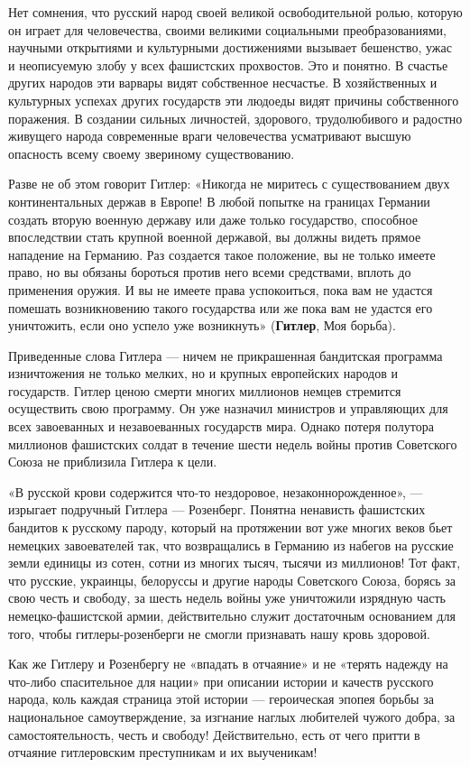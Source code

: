 \documentclass[12pt, a4paper, openany]{book}
\begin{document}
Нет сомнения, что русский народ своей великой освободительной ролью, которую он играет для человечества, своими великими социальными преобразованиями, научными открытиями и культурными достижениями вызывает бешенство, ужас и неописуемую злобу у всех фашистских прохвостов. Это и понятно. В счастье других народов эти варвары видят собственное несчастье. В хозяйственных и культурных успехах других государств эти людоеды видят причины собственного поражения. В создании сильных личностей, здорового, трудолюбивого и радостно живущего народа современные враги человечества усматривают высшую опасность всему своему звериному существованию.

Разве не об этом говорит Гитлер: «Никогда не миритесь с существованием двух континентальных держав в Европе! В любой попытке на границах Германии создать вторую военную державу или даже только государство, способное впоследствии стать крупной военной державой, вы должны видеть прямое нападение на Германию. Раз создается такое положение, вы не только имеете право, но вы обязаны бороться против него всеми средствами, вплоть до применения оружия. И вы не имеете права успокоиться, пока вам не удастся помешать возникновению такого государства или же пока вам не удастся его уничтожить, если оно успело уже возникнуть» (\textbf{Гитлер}, Моя борьба).

Приведенные слова Гитлера — ничем не прикрашенная бандитская программа изничтожения не только мелких, но и крупных европейских народов и государств. Гитлер ценою смерти многих миллионов немцев стремится осуществить свою программу. Он уже назначил министров и управляющих для всех завоеванных и незавоеванных государств мира. Однако потеря полутора миллионов фашистских солдат в течение шести недель войны против Советского Союза не приблизила Гитлера к цели.

«В русской крови содержится что-то нездоровое, незаконнорожденное», — изрыгает подручный Гитлера — Розенберг. Понятна ненависть фашистских бандитов к русскому пароду, который на протяжении вот уже многих веков бьет немецких завоевателей так, что возвращались в Германию из набегов на русские земли единицы из сотен, сотни из многих тысяч, тысячи из миллионов! Тот факт, что русские, украинцы, белоруссы и другие народы Советского Союза, борясь за свою честь и свободу, за шесть недель войны уже уничтожили изрядную часть немецко-фашистской армии, действительно служит достаточным основанием для того, чтобы гитлеры-розенберги не смогли признавать нашу кровь здоровой.

Как же Гитлеру и Розенбергу не «впадать в отчаяние» и не «терять надежду на что-либо спасительное для нации» при описании истории и качеств русского народа, коль каждая страница этой истории — героическая эпопея борьбы за национальное самоутверждение, за изгнание наглых любителей чужого добра, за самостоятельность, честь и свободу! Действительно, есть от чего притти в отчаяние гитлеровским преступникам и их выученикам!
\end{document}
